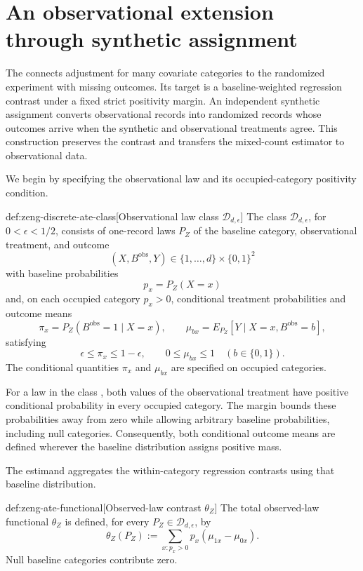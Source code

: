 \section{An observational extension through synthetic assignment}

The  connects adjustment for many covariate categories to the randomized experiment with missing outcomes. Its target is a baseline-weighted regression contrast under a fixed strict positivity margin. An independent synthetic assignment converts observational records into randomized records whose outcomes arrive when the synthetic and observational treatments agree. This construction preserves the contrast and transfers the mixed-count estimator to observational data.

We begin by specifying the observational law and its occupied-category positivity condition.
\begin{definitionv}{def:zeng-discrete-ate-class}[Observational law class \(\mathcal D_{d,\epsilon}\)]
The class \(\mathcal D_{d,\epsilon}\), for \(0<\epsilon<1/2\), consists of one-record laws \(P_Z\) of the baseline category, observational treatment, and outcome
\[
(X,B^{\mathrm{obs}},Y)\in\{1,\ldots,d\}\times\{0,1\}^2
\]
with baseline probabilities
\[
p_x=P_Z(X=x)
\]
and, on each occupied category \(p_x>0\), conditional treatment probabilities and outcome means
\[
\pi_x=P_Z(B^{\mathrm{obs}}=1\mid X=x),
\qquad
\mu_{bx}=E_{P_Z}[Y\mid X=x,B^{\mathrm{obs}}=b],
\]
satisfying
\[
\epsilon\le\pi_x\le1-\epsilon,
\qquad
0\le\mu_{bx}\le1
\quad (b\in\{0,1\}).
\]
The conditional quantities \(\pi_x\) and \(\mu_{bx}\) are specified on occupied categories.
\end{definitionv}

For a law  in the class , both values of the observational treatment  have positive conditional probability in every occupied category. The margin bounds these probabilities away from zero while allowing arbitrary baseline probabilities, including null categories. Consequently, both conditional outcome means are defined wherever the baseline distribution assigns positive mass.

The estimand aggregates the within-category regression contrasts using that baseline distribution.
\begin{definitionv}{def:zeng-ate-functional}[Observed-law contrast $\theta_Z$]
The total observed-law functional \(\theta_Z\) is defined, for every \(P_Z\in\mathcal D_{d,\epsilon}\), by
\[
\theta_Z(P_Z)
:=
\sum_{x:p_x>0}p_x(\mu_{1x}-\mu_{0x}).
\]
Null baseline categories contribute zero.
\end{definitionv}

